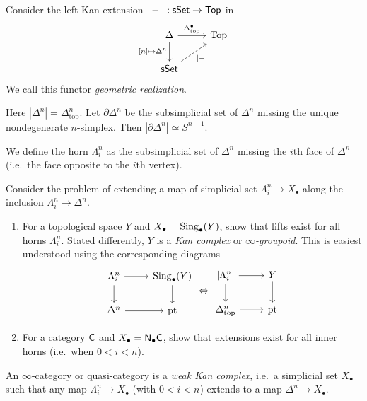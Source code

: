 \documentclass{amsart}
\begin{document}
\begin{cons}
	Consider the left Kan extension $|-|: \mathsf{sSet} \to \mathsf{Top}$ in
	\[
		\begin{tikzcd}
			\Delta \arrow[r, "\Delta^\bullet_{\mathrm{top}}"] \arrow[d, swap, "{[n]} \mapsto \Delta^n"] & \mathrm{Top} \\
	\sSet \arrow[ur, dashed, swap, "|-|"]
		\end{tikzcd}
	\]
	We call this functor \emph{geometric realization}.
\end{cons}

\begin{ex}
	Here $|\Delta^n| = \Delta^n_{\mathrm{top}}$.
	Let $\partial \Delta^n$ be the subsimplicial set of $\Delta^n$ missing the unique nondegenerate $n$-simplex.
	Then $|\partial \Delta^n| \simeq S^{n-1}$.
\end{ex}

We define the horn $\Lambda_i^n$ as the subsimplicial set of $\Delta^n$ missing the $i$th face of $\Delta^n$ (i.e.\ the face opposite to the $i$th vertex).

\begin{exer}
	Consider the problem of extending a map of simplicial set $\Lambda_i^n \to X_\bullet$ along the inclusion $\Lambda_i^n \to \Delta^n$.
	\begin{enumerate}
		\item For a topological space $Y$ and $X_\bullet = \operatorname{Sing}_\bullet(Y)$, show that lifts exist for all horns $\Lambda_i^n$.
		Stated differently, $Y$ is a \emph{Kan complex} or \emph{$\infty$-groupoid}.
		This is easiest understood using the corresponding diagrams
		\[
			\begin{tikzcd}
				\Lambda^n_i \rar \dar & \Sing_\bullet(Y) \dar \\
				\Delta^n \rar & \pt
			\end{tikzcd}
			\Leftrightarrow
			\begin{tikzcd}
				{|\Lambda^n_i|} \rar \dar & Y \dar \\
				\Delta^n_{\mathrm{top}} \rar & \pt
			\end{tikzcd}
		\]
		\item For a category $\mathsf{C}$ and $X_\bullet = \mathsf{N}_\bullet \mathsf{C}$, show that extensions exist for all inner horns (i.e.\ when $0 < i < n$).
	\end{enumerate}
\end{exer}

\begin{dfn}
	An $\infty$-category or quasi-category is a \emph{weak Kan complex}, i.e.\ a simplicial set $X_\bullet$ such that any map $\Lambda_i^n \to X_\bullet$ (with $0 < i < n$) extends to a map $\Delta^n \to X_\bullet$.
\end{dfn}
\end{document}
